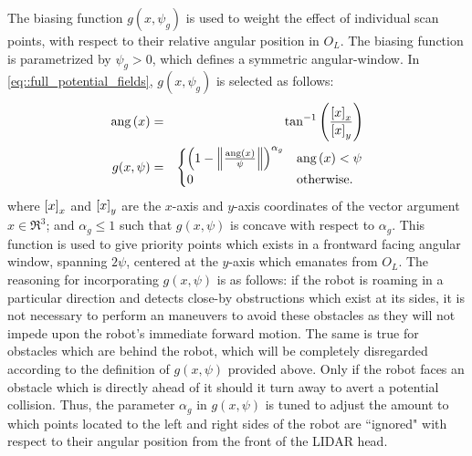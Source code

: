 			The biasing function $g(x,\psi_{g})$ is used to weight the effect of individual scan points, with respect to their relative angular position in $O_{L}$. The biasing function is parametrized by $\psi_{g}>0$, which defines a symmetric angular-window. In \ref{eq::full_potential_fields}, $g(x,\psi_{g})$ is selected as follows:
				\begin{eqnarray}
					\text{ang}\left(x\right) &=& \tan^{-1}\left( \frac{\left[x\right]_{x}}{\left[x\right]_{y}} \right) \nonumber\\
					g(x,\psi) &=& 
					\begin{cases}
					\left(1-\left\lVert\frac{\text{ang}\left(x\right)}{\psi}\right\rVert\right)^{\alpha_{g}}	& \text{ang}\left(x\right) < \psi \\
					0 	& \text{otherwise}.
					\end{cases}
				\end{eqnarray}
			where $\left[x\right]_{x}$ and $\left[x\right]_{y}$ are the $x$-axis and $y$-axis coordinates of the vector argument $x\in\Re^{3}$; and $\alpha_{g}\leq1$ such that $g(x,\psi)$ is concave with respect to $\alpha_{g}$. This function is used to give priority points which exists in a frontward facing angular window, spanning $2 \psi$, centered at the $y$-axis which emanates from $O_{L}$. The reasoning for incorporating $g(x,\psi)$ is as follows: if the robot is roaming in a particular direction and detects close-by obstructions which exist at its sides, it is not necessary to perform an maneuvers to avoid these obstacles as they will not impede upon the robot's immediate forward motion. The same is true for obstacles which are behind the robot, which will be completely disregarded according to the definition of $g(x,\psi)$ provided above. Only if the robot faces an obstacle which is directly ahead of it should it turn away to avert a potential collision. Thus, the parameter $\alpha_{g}$ in $g(x,\psi)$ is tuned to adjust the amount to which points located to the left and right sides of the robot are ``ignored" with respect to their angular position from the front of the LIDAR head.


